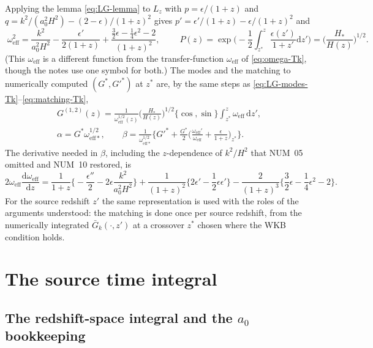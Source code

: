 \documentclass[11pt,a4paper]{article}
\newcommand{\dd}{\mathrm{d}}
\newcommand{\Gb}{\bar{G}}
\newcommand{\om}{\omega_{\mathrm{eff}}}
\newcommand{\omstar}{\omega_{\mathrm{eff}*}}
\newcommand{\eps}{\epsilon}
\newcommand{\note}[1]{\textsf{#1}}
\theoremstyle{remark}
\begin{document}
Applying the lemma \eqref{eq:LG-lemma} to $L_z$ with $p = \eps/(1+z)$ and $q = k^2/(a_0^2H^2) - (2-\eps)/(1+z)^2$ gives $p' = \eps'/(1+z) - \eps/(1+z)^2$ and
\begin{equation}
\boxed{\;
\om^2 = \frac{k^2}{a_0^2H^2} - \frac{\eps'}{2(1+z)} + \frac{\tfrac32\eps - \tfrac14\eps^2 - 2}{(1+z)^2},\;}
\qquad
P(z) = \exp\Big(-\frac12\int_{z^*}^{z}\frac{\eps(z')}{1+z'}\dd z'\Big) = \Big(\frac{H_*}{H(z)}\Big)^{1/2}.
\label{eq:omega-Gk}
\end{equation}
(This $\om$ is a different function from the transfer-function $\om$ of \eqref{eq:omega-Tk}, though the notes use one symbol for both.) The modes and the matching to numerically computed $(G^*,G'^*)$ at $z^*$ are, by the same steps as \eqref{eq:LG-modes-Tk}--\eqref{eq:matching-Tk},
\begin{equation}
\begin{gathered}
G^{(1,2)}(z) = \frac{1}{\om^{1/2}(z)}\Big(\frac{H_*}{H(z)}\Big)^{1/2}\{\cos,\sin\}\int_{z^*}^{z}\om\,\dd z',\\
\alpha = G^*\omstar^{1/2},\qquad
\beta = \frac{1}{\omstar^{1/2}}\Big\{G'^* + \frac{G^*}{2}\Big(\frac{\om'}{\om} + \frac{\eps}{1+z}\Big)_{z^*}\Big\}.
\end{gathered}
\label{eq:matching-Gk}
\end{equation}
The derivative needed in $\beta$, including the $z$-dependence of $k^2/H^2$ that \note{NUM}~05 omitted and \note{NUM}~10 restored, is
\begin{equation}
2\om\frac{\dd\om}{\dd z}
= \frac{1}{1+z}\Big\{-\frac{\eps''}{2} - 2\eps\frac{k^2}{a_0^2H^2}\Big\}
+ \frac{1}{(1+z)^2}\Big\{2\eps' - \frac12\eps\eps'\Big\}
- \frac{2}{(1+z)^3}\Big\{\frac32\eps - \frac14\eps^2 - 2\Big\}.
\label{eq:domega-Gk}
\end{equation}
For the source redshift $z'$ the same representation is used with the roles of the arguments understood: the matching is done once per source redshift, from the numerically integrated $\Gb_k(\cdot,z')$ at a crossover $z^*$ chosen where the WKB condition holds.

\section{The source time integral}
\label{sec:time-integral}

\subsection{The redshift-space integral and the \texorpdfstring{$a_0$}{a0} bookkeeping}
\label{sec:a0-handoff}
\end{document}
